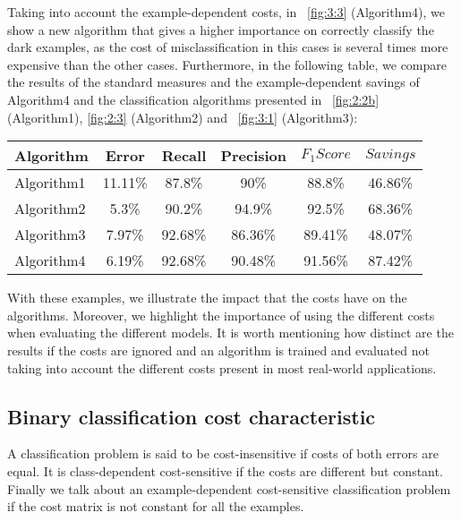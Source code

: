 {{Taking into account the example-dependent costs, in \figurename{~\ref{fig:3:3}} (Algorithm4), we 
show a new algorithm that gives a higher importance on correctly classify the dark examples, as the 
cost of misclassification in this cases is several times more expensive than the other cases.
Furthermore, in the following table, we compare the results of the standard measures and the 
example-dependent savings of Algorithm4 and the classification algorithms presented in 
\figurename{~\ref{fig:2:2b}} (Algorithm1), \figurename{ \ref{fig:2:3}} (Algorithm2) and 
\figurename{~\ref{fig:3:1}} (Algorithm3):
\begin{center}
    \footnotesize
  \begin{tabular}{l|c|c|c|c|c}
  Algorithm & Error & Recall & Precision & $F_1Score$ & $Savings$ \\
  \hline
  Algorithm1 & 11.11\% & 87.8\%& 90\%& 88.8\% & 46.86\%\\ %
  Algorithm2 & 5.3\% & 90.2\%& 94.9\%& 92.5\% & 68.36\%\\ %
  Algorithm3 & 7.97\%& 92.68\% &86.36\%& 89.41\% & 48.07\% \\
  Algorithm4 & 6.19\%& 92.68\% &90.48\%& 91.56\% & 87.42\% \\
  \end{tabular}
\end{center}
\vspace{0.3cm}

With these examples, we illustrate the impact that the costs have on the algorithms. 
Moreover, we highlight the importance of using the different costs when evaluating the different 
models. It is worth mentioning how distinct are the results if the costs are ignored and an 
algorithm is trained and evaluated not taking into account the different costs present in most 
real-world 
applications.

  
\subsection{Binary classification cost characteristic}
\label{sec:3:cost_characteristic}  

  A classification problem is said to be cost-insensitive if costs of both errors are equal. It 
  is class-dependent cost-sensitive if the costs are different but constant. Finally we talk 
  about an example-dependent cost-sensitive classification problem if the cost matrix is not 
  constant for all the examples.

}}
